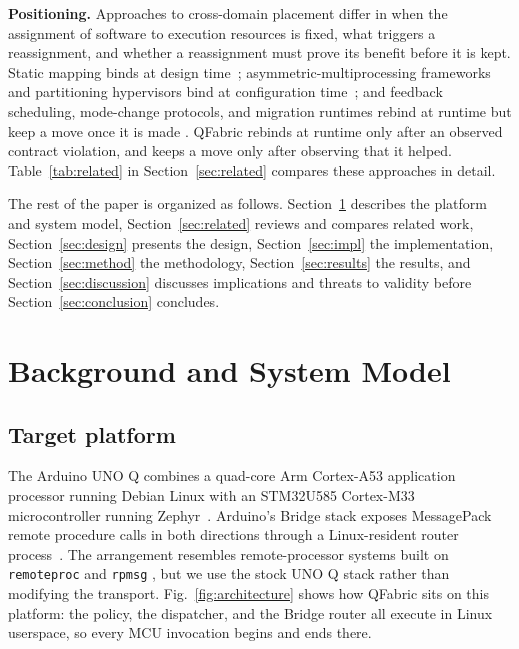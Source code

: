 \documentclass[conference]{IEEEtran}
\newcommand{\system}{QFabric\xspace}
\begin{document}
\textbf{Positioning.} Approaches to cross-domain placement differ in when the
assignment of software to execution resources is fixed, what triggers a
reassignment, and whether a reassignment must prove its benefit before it is
kept. Static mapping binds at design time~\cite{topcuoglu2002heft};
asymmetric-multiprocessing frameworks and partitioning hypervisors bind at
configuration time~\cite{openampProject,ramsauer2017jailhouse,martins2020bao};
and feedback scheduling, mode-change protocols, and migration runtimes rebind
at runtime but keep a move once it is made
\cite{lu2002feedback,real2004mode,goraczko2006comos,rouxel2021yasmin}.
\system rebinds at runtime only after an observed contract violation, and
keeps a move only after observing that it helped.
Table~\ref{tab:related} in Section~\ref{sec:related} compares these
approaches in detail.

The rest of the paper is organized as follows.
Section~\ref{sec:background} describes the platform and system model,
Section~\ref{sec:related} reviews and compares related work,
Section~\ref{sec:design} presents the design, Section~\ref{sec:impl} the
implementation, Section~\ref{sec:method} the methodology,
Section~\ref{sec:results} the results, and Section~\ref{sec:discussion}
discusses implications and threats to validity before
Section~\ref{sec:conclusion} concludes.

\section{Background and System Model}
\label{sec:background}
\subsection{Target platform}
The Arduino UNO Q combines a quad-core Arm Cortex-A53 application processor
running Debian Linux with an STM32U585 Cortex-M33 microcontroller running
Zephyr~\cite{arduinoUnoQ}. Arduino's Bridge stack exposes MessagePack remote
procedure calls in both directions through a Linux-resident router
process~\cite{arduinoRouterBridge}. The arrangement resembles
remote-processor systems built on \texttt{remoteproc} and \texttt{rpmsg}
\cite{linuxRemoteproc,linuxRpmsg}, but we use the stock UNO Q stack rather
than modifying the transport. Fig.~\ref{fig:architecture} shows how \system
sits on this platform: the policy, the dispatcher, and the Bridge router all
execute in Linux userspace, so every MCU invocation begins and ends there.
\end{document}

